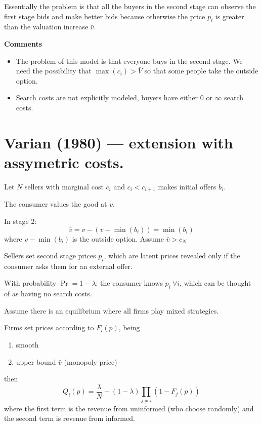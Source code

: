 \documentclass[12pt]{article}
\theoremstyle{plain}
\theoremstyle{plain}
\begin{document}
Essentially the problem is that all the buyers in the second stage can observe the first stage bids and make better bids because otherwise the price $p_i$ is greater than the valuation increase $\bar{v}$. 



\textbf{Comments}
\begin{itemize}
    \item The problem of this model is that everyone buys in the second stage. We need the possibility that $\max(c_i) > \bar{V}$ so that some people take the outside option.

    \item Search costs are not explicitly modeled, buyers have either 0 or $\infty$ search costs. 
\end{itemize}





 

 \section*{Varian (1980) --- extension with assymetric costs. }


 
Let $N$ sellers with marginal cost $c_i$ and $c_i < c_{i+1}$  makes initial offers $b_i$. 

The consumer values the good at $v$.

In stage 2:
\[
\bar{v} = v - (v - \min(b_i)) = \min(b_i)
\]
where $v - \min(b_i)$ is the outside option. Assume $\bar{v}>c_N$

Sellers set second stage prices $p_i$, which are latent prices revealed only if the consumer asks them for an external offer.

With probability $\Pr = 1- \lambda$: the consumer knows $p_i\ \forall i$, which can be thought of as having no search costs.

Assume there is an equilibrium where all firms play mixed strategies. 

 Firms set prices according to $F_i(p)$, being
\begin{enumerate}
    \item smooth
    \item upper bound $\bar{v} $ (monopoly price)
\end{enumerate}
then 
\[
Q_i(p) = \frac{\lambda}{N} +  (1 - \lambda) \prod_{j\neq i} \left(1 - F_j(p)\right)
\]
where the first term is the revenue from uninformed (who choose randomly) and the second term is revenue from informed. 
\end{document}
